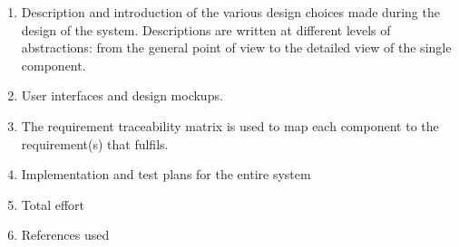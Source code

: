 \begin{enumerate}
	\item Description and introduction of the various design choices made during the design of the system. Descriptions are written at different levels of abstractions: from the general point of view to the detailed view of the single component.
	\item User interfaces and design mockups.
	\item The requirement traceability matrix is used to map each component to the requirement(s) that fulfils.
	\item Implementation and test plans for the entire system
	\item Total effort
	\item References used
\end{enumerate}






















